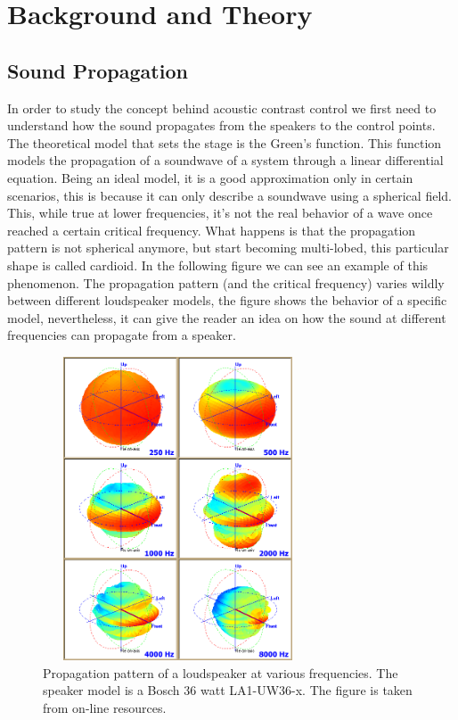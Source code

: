 
\chapter{Background and Theory} %

\label{Chapter2} %



\section{Sound Propagation}

In order to study the concept behind acoustic contrast control we first need to understand how the sound propagates from the speakers to the control points. The theoretical model that sets the stage is the Green's function. This function models the propagation of a soundwave of a system through a linear differential equation. Being an ideal model, it is a good approximation only in certain scenarios, this is because it can only describe a soundwave using a spherical field. This, while true at lower frequencies, it's not the real behavior of a wave once reached a certain critical frequency. What happens is that the propagation pattern is not spherical anymore, but start becoming multi-lobed, this particular shape is called cardioid. In the following figure we can see an example of this phenomenon. The propagation pattern (and the critical frequency) varies wildly between different loudspeaker models, the figure shows the behavior of a specific model, nevertheless, it can give the reader an idea on how the sound at different frequencies can propagate from a speaker.

\begin{figure}[th]
\centering
\includegraphics[width=8cm,height=9cm,keepaspectratio]{Figures/directivity}
\decoRule
\caption[Propagation pattern]{Propagation pattern of a loudspeaker at various frequencies. The speaker model is a Bosch 36 watt LA1-UW36-x. The figure is taken from on-line resources.}
\label{fig:directivity}
\end{figure}

